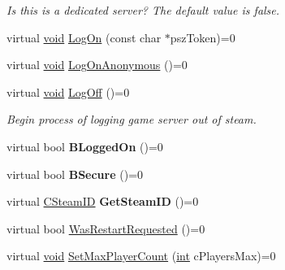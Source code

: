\begin{DoxyCompactItemize}
\begin{DoxyCompactList}\small\item\em Is this is a dedicated server? The default value is false. \end{DoxyCompactList}\item 
virtual \hyperlink{SDL__audio_8h_a52835ae37c4bb905b903cbaf5d04b05f}{void} \hyperlink{classISteamGameServer_aeb0b8c4368d82afaef1f00de926108ff}{Log\+On} (const char $\ast$psz\+Token)=0
\item 
virtual \hyperlink{SDL__audio_8h_a52835ae37c4bb905b903cbaf5d04b05f}{void} \hyperlink{classISteamGameServer_ab54477676e6915f33d32b42e71ae63ab}{Log\+On\+Anonymous} ()=0
\item 
\hypertarget{classISteamGameServer_acfbf4de28f5b30ae94ab4301d2e379e8}{}virtual \hyperlink{SDL__audio_8h_a52835ae37c4bb905b903cbaf5d04b05f}{void} \hyperlink{classISteamGameServer_acfbf4de28f5b30ae94ab4301d2e379e8}{Log\+Off} ()=0\label{classISteamGameServer_acfbf4de28f5b30ae94ab4301d2e379e8}

\begin{DoxyCompactList}\small\item\em Begin process of logging game server out of steam. \end{DoxyCompactList}\item 
\hypertarget{classISteamGameServer_a459f91ebd7ff6bf7d4fa71851ca58480}{}virtual bool {\bfseries B\+Logged\+On} ()=0\label{classISteamGameServer_a459f91ebd7ff6bf7d4fa71851ca58480}

\item 
\hypertarget{classISteamGameServer_a508f92922dc12cdc7f6f71596ac1a8b0}{}virtual bool {\bfseries B\+Secure} ()=0\label{classISteamGameServer_a508f92922dc12cdc7f6f71596ac1a8b0}

\item 
\hypertarget{classISteamGameServer_aabf710b337065b0d57cdb92844116106}{}virtual \hyperlink{classCSteamID}{C\+Steam\+I\+D} {\bfseries Get\+Steam\+I\+D} ()=0\label{classISteamGameServer_aabf710b337065b0d57cdb92844116106}

\item 
virtual bool \hyperlink{classISteamGameServer_a07da94c7bc216698683cd567cde93fb3}{Was\+Restart\+Requested} ()=0
\item 
\hypertarget{classISteamGameServer_a52955851d455e48c9b464bae8ebd6143}{}virtual \hyperlink{SDL__audio_8h_a52835ae37c4bb905b903cbaf5d04b05f}{void} \hyperlink{classISteamGameServer_a52955851d455e48c9b464bae8ebd6143}{Set\+Max\+Player\+Count} (\hyperlink{SDL__thread_8h_a6a64f9be4433e4de6e2f2f548cf3c08e}{int} c\+Players\+Max)=0\label{classISteamGameServer_a52955851d455e48c9b464bae8ebd6143}


\end{DoxyCompactItemize}
